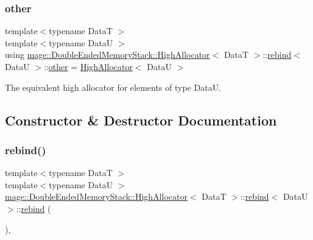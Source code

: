 \subsubsection{\texorpdfstring{other}{other}}
{\footnotesize\ttfamily template$<$typename DataT $>$ \\
template$<$typename DataU $>$ \\
using \hyperlink{structmage_1_1_double_ended_memory_stack_1_1_high_allocator}{mage\+::\+Double\+Ended\+Memory\+Stack\+::\+High\+Allocator}$<$ DataT $>$\+::\hyperlink{structmage_1_1_double_ended_memory_stack_1_1_high_allocator_1_1rebind}{rebind}$<$ DataU $>$\+::\hyperlink{structmage_1_1_double_ended_memory_stack_1_1_high_allocator_1_1rebind_aee127399c76826ea9b23986ee10f19fa}{other} =  \hyperlink{structmage_1_1_double_ended_memory_stack_1_1_high_allocator}{High\+Allocator}$<$ DataU $>$}

The equivalent high allocator for elements of type {\ttfamily DataU}. 

\subsection{Constructor \& Destructor Documentation}
\hypertarget{structmage_1_1_double_ended_memory_stack_1_1_high_allocator_1_1rebind_ae8b23efa6f7435efbab9add1ce097c99}{}\label{structmage_1_1_double_ended_memory_stack_1_1_high_allocator_1_1rebind_ae8b23efa6f7435efbab9add1ce097c99} 
\subsubsection{\texorpdfstring{rebind()}{rebind()}\hspace{0.1cm}{\footnotesize\ttfamily [1/3]}}
{\footnotesize\ttfamily template$<$typename DataT $>$ \\
template$<$typename DataU $>$ \\
\hyperlink{structmage_1_1_double_ended_memory_stack_1_1_high_allocator}{mage\+::\+Double\+Ended\+Memory\+Stack\+::\+High\+Allocator}$<$ DataT $>$\+::\hyperlink{structmage_1_1_double_ended_memory_stack_1_1_high_allocator_1_1rebind}{rebind}$<$ DataU $>$\+::\hyperlink{structmage_1_1_double_ended_memory_stack_1_1_high_allocator_1_1rebind}{rebind} (\begin{DoxyParamCaption}{ }\end{DoxyParamCaption})\hspace{0.3cm}{\ttfamily [private]}, {\ttfamily [delete]}}

